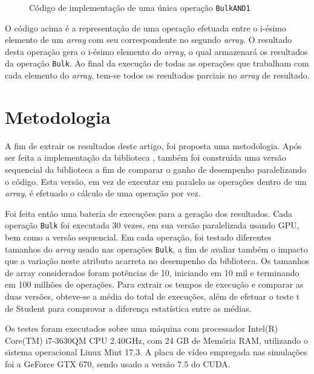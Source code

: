 \documentclass[12pt]{article}
\begin{document}
\begin{figure}[!h]
\centering

\caption{Código de implementação de uma única operação \texttt{BulkAND1}}
\label{fig:bulkoperation}
\end{figure}

	O código acima é a representação de uma operação efetuada entre o i-ésimo elemento de um \textit{array} com seu correspondente no segundo \textit{array}. O resultado desta operação gera o i-ésimo elemento do \textit{array}, o qual armazenará os resultados da operação \texttt{Bulk}. Ao final da execução de todas as operações que trabalham com cada elemento do \textit{array}, tem-se todos os resultados parciais no \textit{array} de resultado.

\section{Metodologia}
\label{sec:metodologia}

	A fim de extrair os resultados deste artigo, foi proposta uma metodologia. Após ser feita a implementação da biblioteca \libname, também foi construída uma versão sequencial da biblioteca a fim de comparar o ganho de desempenho paralelizando o código. Esta versão, em vez de executar em paralelo as operações dentro de um \textit{array}, é efetuado o cálculo de uma operação por vez.
	
	Foi feita então uma bateria de execuções para a geração dos resultados. Cada operação \texttt{Bulk} foi executada 30 vezes, em sua versão paralelizada usando GPU, bem como a versão sequencial. Em cada operação, foi testado diferentes tamanhos do \textit{array} usado nas operações \texttt{Bulk}, a fim de avaliar também o impacto que a variação neste atributo acarreta no desempenho da biblioteca. Os tamanhos de array considerados foram potências de 10, iniciando em 10 mil e terminando em 100 milhões de operações. Para extrair os tempos de execução e comparar as duas versões, obteve-se a média do total de execuções, além de efetuar o teste t de Student para comprovar a diferença estatística entre as médias.
	
	Os testes foram executados sobre uma máquina com processador Intel(R) Core(TM) i7-3630QM CPU 2.40GHz, com 24 GB de Memória RAM, utilizando o sistema operacional Linux Mint 17.3. A placa de vídeo empregada nas simulações foi a GeForce GTX 670, sendo usado a versão 7.5 do CUDA.
	
\end{document}
